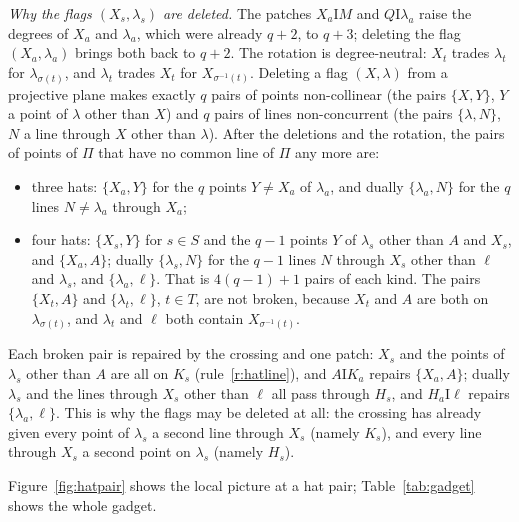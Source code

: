 \documentclass[11pt]{amsart}
\theoremstyle{definition}
\theoremstyle{remark}
\newcommand{\I}{\mathrel{\mathrm{I}}}
\newcommand{\lam}{\lambda}
\begin{document}
\emph{Why the flags $(X_s,\lam_s)$ are deleted.} The patches $X_a\I M$ and $Q\I\lam_a$ raise the degrees of $X_a$ and $\lam_a$, which were already $q+2$, to $q+3$; deleting the flag $(X_a,\lam_a)$ brings both back to $q+2$. The rotation is degree-neutral: $X_t$ trades $\lam_t$ for $\lam_{\sigma(t)}$, and $\lam_t$ trades $X_t$ for $X_{\sigma^{-1}(t)}$. Deleting a flag $(X,\lam)$ from a projective plane makes exactly $q$ pairs of points non-collinear (the pairs $\{X,Y\}$, $Y$ a point of $\lam$ other than $X$) and $q$ pairs of lines non-concurrent (the pairs $\{\lam,N\}$, $N$ a line through $X$ other than $\lam$). After the deletions and the rotation, the pairs of points of $\Pi$ that have no common line of $\Pi$ any more are:
\begin{itemize}[leftmargin=1.5em]
\item three hats: $\{X_a,Y\}$ for the $q$ points $Y\ne X_a$ of $\lam_a$, and dually $\{\lam_a,N\}$ for the $q$ lines $N\neq\lam_a$ through $X_a$;
\item four hats: $\{X_s,Y\}$ for $s\in S$ and the $q-1$ points $Y$ of $\lam_s$ other than $A$ and $X_s$, and $\{X_a,A\}$; dually $\{\lam_s,N\}$ for the $q-1$ lines $N$ through $X_s$ other than $\ell$ and $\lam_s$, and $\{\lam_a,\ell\}$. That is $4(q-1)+1$ pairs of each kind. The pairs $\{X_t,A\}$ and $\{\lam_t,\ell\}$, $t\in T$, are not broken, because $X_t$ and $A$ are both on $\lam_{\sigma(t)}$, and $\lam_t$ and $\ell$ both contain $X_{\sigma^{-1}(t)}$.
\end{itemize}
Each broken pair is repaired by the crossing and one patch: $X_s$ and the points of $\lam_s$ other than $A$ are all on $K_s$ (rule~\ref{r:hatline}), and $A\I K_a$ repairs $\{X_a,A\}$; dually $\lam_s$ and the lines through $X_s$ other than $\ell$ all pass through $H_s$, and $H_a\I\ell$ repairs $\{\lam_a,\ell\}$. This is why the flags may be deleted at all: the crossing has already given every point of $\lam_s$ a second line through $X_s$ (namely $K_s$), and every line through $X_s$ a second point on $\lam_s$ (namely $H_s$).

Figure~\ref{fig:hatpair} shows the local picture at a hat pair; Table~\ref{tab:gadget} shows the whole gadget.
\end{document}

